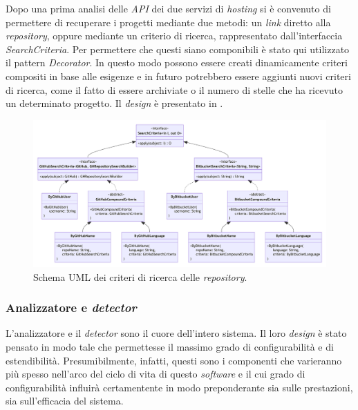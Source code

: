 Dopo una prima analisi delle \textit{API} dei due servizi di \textit{hosting} si è convenuto di permettere di recuperare i progetti mediante due metodi: un \textit{link} diretto alla \textit{repository}, oppure mediante un criterio di ricerca, rappresentato dall'interfaccia \textit{SearchCriteria}.
%
Per permettere che questi siano componibili è stato qui utilizzato il pattern \textit{Decorator}.
%
In questo modo possono essere creati dinamicamente criteri compositi in base alle esigenze e in futuro potrebbero essere aggiunti nuovi criteri di ricerca, come il fatto di essere archiviate o il numero di stelle che ha ricevuto un determinato progetto.
%
Il \textit{design} è presentato in .

\begin{figure}[h!]
    \centering
    \includegraphics[width=\textwidth]{resources/img/02-search-criteria.pdf}
    \caption{Schema UML dei criteri di ricerca delle \textit{repository}.}
    \label{img:02-search-criteria}
\end{figure}


\subsubsection*{Analizzatore e \textit{detector}}
L'analizzatore e il \textit{detector} sono il cuore dell'intero sistema.
%
Il loro \textit{design} è stato pensato in modo tale che permettesse il massimo grado di configurabilità e di estendibilità.
%
Presumibilmente, infatti, questi sono i componenti che varieranno più spesso nell'arco del ciclo di vita di questo \textit{software} e il cui grado di configurabilità influirà certamentente in modo preponderante sia sulle prestazioni, sia sull'efficacia del sistema.

